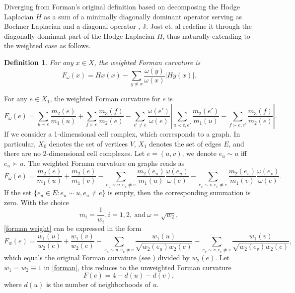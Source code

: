 \documentclass{article}
\newtheorem{lemma}{Lemma}[section]
\newtheorem{definition}{Definition}
\begin{document}
Diverging from Forman's original definition based on decomposing the Hodge Laplacian $H$ as a sum of a minimally diagonally dominant operator serving as Bochner Laplacian and a diagonal operator \cite{F03}, J. Jost et. al \cite{JM21} redefine it through the diagonally dominant part of the Hodge Laplacian $H$,  thus naturally extending to the weighted case as follows.
\begin{definition}
For any $x\in X$, the weighted Forman curvature is
\[F_\omega(x)=Hx(x)-\sum_{y\neq x}\frac{\omega(y)}{\omega(x)}|Hy(x)|.\]
\end{definition}
For any $e\in X_1$, the weighted Forman curvature for $e$ is
\begin{equation}\label{Forman0}
F_{\omega}(e)=\sum_{u\prec e}\frac{m_2(e)}{m_1(u)}+\sum_{f\succ e}\frac{m_3(f)}{m_2(e)}-\sum_{e'\neq e}\frac{\omega(e')}{\omega(e)}\left|\sum_{u\prec e,e'}\frac{m_2(e')}{m_1(u)}-\sum_{f\succ e,e'}\frac{m_3(f)}{m_2(e)}\right|.
\end{equation}
If we consider a 1-dimensional cell complex, which corresponds to a graph. In particular, $X_0$ denotes the set of vertices $V$, $X_1$ denotes the set of edges $E$, and there are no 2-dimensional cell complexes. Let $e=(u,v)$, we denote $e_u\sim u$ iff $e_u\succ u$. The weighted Forman curvature on graphs reads as
\begin{equation}\label{forman weight}
  F_{\omega}(e)=\frac{m_2(e)}{m_1(u)}+\frac{m_2(e)}{m_1(v)}-\sum_{e_u\sim u,e_u\neq e}\frac{m_2(e_u)}{m_1(u)}\frac{\omega(e_u)}{\omega(e)}-\sum_{e_v\sim v,e_v\neq e}\frac{m_2(e_v)}{m_1(v)}\frac{\omega(e_v)}{\omega(e)}.
\end{equation}
If the set $\{e_u\in E: e_u\sim u,e_u\neq e\}$ is empty, then the corresponding summation is zero.
With the choice
\[m_i=\frac{1}{w_i}, i=1,2, ~\mbox{and}~ \omega=\sqrt{w_2},\]
\eqref{forman weight} can be expressed in the form
\begin{equation}\label{forman}
F_{w}(e)=\frac{w_1(u)}{w_2(e)}+\frac{w_1(v)}{w_2(e)}-\sum_{e_u\sim u,e_u\neq e}\frac{w_1(u)}{\sqrt{w_2(e_u)w_2(e)}}-\sum_{e_v\sim v,e_v\neq e}\frac{w_1(v)}{\sqrt{w_2(e_v)w_2(e)}},
\end{equation}
which equals the original Forman curvature (see \cite{F03}) divided by $w_2(e).$ Let $w_1=w_2\equiv 1$ in \eqref{forman}, this reduces to the unweighted Forman curvature
\begin{equation*}\label{unforman}
F(e)=4-d(u)-d(v),
\end{equation*}
where $d(u)$ is the number of neighborhoods of $u$.
\end{document}
